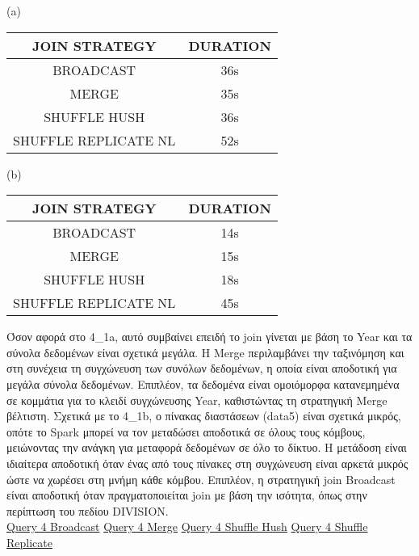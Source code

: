 \documentclass{article}
\begin{document}
\begin{center}
(a)
\begin{tabular}{|c|c|}
\hline
\textbf{JOIN STRATEGY} & \textbf{DURATION} \\
\hline
BROADCAST & 36s \\
\hline
MERGE & 35s \\
\hline
SHUFFLE HUSH & 36s \\
\hline
SHUFFLE REPLICATE NL & 52s \\
\hline
\end{tabular}
\quad
(b)
\begin{tabular}{|c|c|}
\hline
\textbf{JOIN STRATEGY} & \textbf{DURATION} \\
\hline
BROADCAST & 14s \\
\hline
MERGE & 15s \\
\hline
SHUFFLE HUSH & 18s \\
\hline
SHUFFLE REPLICATE NL & 45s \\
\hline
\end{tabular}
\end{center} 

Όσον αφορά στο 4\_1a, αυτό συμβαίνει επειδή το join γίνεται με βάση το 
Year και τα σύνολα δεδομένων είναι σχετικά μεγάλα. 
Η Merge περιλαμβάνει την ταξινόμηση και στη συνέχεια τη συγχώνευση των συνόλων δεδομένων, 
η οποία είναι αποδοτική για μεγάλα σύνολα δεδομένων. Επιπλέον, τα δεδομένα είναι ομοιόμορφα 
κατανεμημένα σε κομμάτια για το κλειδί συγχώνευσης Year, καθιστώντας τη στρατηγική Merge 
βέλτιστη. Σχετικά με το 4\_1b, ο πίνακας διαστάσεων (data5) είναι σχετικά μικρός, οπότε το 
Spark μπορεί να τον μεταδώσει αποδοτικά σε όλους τους κόμβους, μειώνοντας την ανάγκη για 
μεταφορά δεδομένων σε όλο το δίκτυο. Η μετάδοση είναι ιδιαίτερα αποδοτική όταν ένας από τους 
πίνακες στη συγχώνευση είναι αρκετά μικρός ώστε να χωρέσει στη μνήμη κάθε κόμβου. Επιπλέον, 
η στρατηγική join Broadcast είναι αποδοτική όταν πραγματοποιείται join με βάση την ισότητα, όπως στην περίπτωση του 
πεδίου DIVISION.\\

\href{http://83.212.81.191:18080/history/application_1705357398960_0019/jobs/} {Query 4 Broadcast}
\href{http://83.212.81.191:18080/history/application_1705357398960_0020/jobs/} {Query 4 Merge}
\href{http://83.212.81.191:18080/history/application_1705357398960_0021/jobs/} {Query 4 Shuffle Hush}
\href{http://83.212.81.191:18080/history/application_1705357398960_0023/jobs/} {Query 4 Shuffle Replicate} \\
\end{document}
